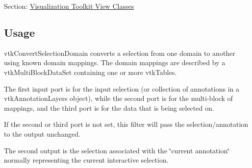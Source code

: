 Section\-: \hyperlink{sec_vtkviews}{Visualization Toolkit View Classes} \hypertarget{vtkwidgets_vtkxyplotwidget_Usage}{}\subsection{Usage}\label{vtkwidgets_vtkxyplotwidget_Usage}
vtk\-Convert\-Selection\-Domain converts a selection from one domain to another using known domain mappings. The domain mappings are described by a vtk\-Multi\-Block\-Data\-Set containing one or more vtk\-Tables.

The first input port is for the input selection (or collection of annotations in a vtk\-Annotation\-Layers object), while the second port is for the multi-\/block of mappings, and the third port is for the data that is being selected on.

If the second or third port is not set, this filter will pass the selection/annotation to the output unchanged.

The second output is the selection associated with the \char`\"{}current annotation\char`\"{} normally representing the current interactive selection.

